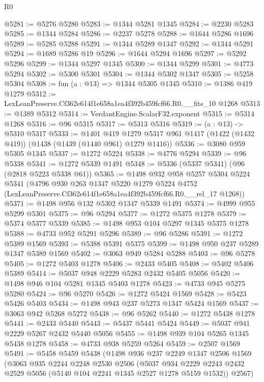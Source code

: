 \begin{lexlean}{R0}
\begin{coremodule}
@5281 := @5276 @5280
@5283 := @1344 @5281 @1345
@5284 := @2230 @5283
@5285 := @1344 @5284
@5286 := @2237 @5278
@5288 := @1644 @5286 @1696
@5289 := @5285 @5288
@5291 := @1344 @5289 @1347
@5292 := @1344 @5291
@5294 := @1689 @5286 @19
@5296 := @1644 @5294 @1696
@5297 := @5292 @5296
@5299 := @1344 @5297 @1345
@5300 := @1344 @5299
@5301 := @4773 @5294
@5302 := @5300 @5301
@5304 := @1344 @5302 @1347
@5305 := @5258 @5304
@5308 := fun (a : @13) => @1344 @5305 @1345
@5310 := @1386 @419 @1279
@5312 := LexLeanPreserve.Cf362e614f1e658a1ea4f392b459fcf66.R0.__fits_10 @1268
@5313 := @1389 @5312
@5314 := VerdantEngine.ScalarF32.exponent
@5315 := @5314 @1268
@5316 := @96 @5315
@5317 := @5313 @5316
@5319 := (a : @13) -> @5310 @5317
@5333 := @1401
    @419
    @1279
    @5317
    @961
    @1417
    (@1422 (@1432 @419))
    (@1438 (@1439 (@1440 @961) @1279 @1416))
@5336 := @3080 @959 @5305 @1345
@5337 := @1272 @5224
@5338 := @4776 @5294
@5339 := @96 @5338
@5341 := @1272 @5339 @1491
@5348 := @5336 (@5337 @5341) (@96 (@2818 @5223 @5338 @61))
@5365 := @1498
    @932
    @958
    @5257
    @5304
    @5224
    @5341
    (@4796
      @930
      @263
      @1347
      @5220
      @1279
      @5224
      @4752
      (LexLeanPreserve.Cf362e614f1e658a1ea4f392b459fcf66.R0.__rel_17 @1268))
@5371 := @1498 @956 @132 @5302 @1347 @5339 @1491
@5374 := @4999 @955 @5299 @5301
@5375 := @96 @5294
@5377 := @1272 @5375 @1278
@5379 := @5374 @5377 @5339
@5385 := @1498 @953 @104 @5297 @1345 @5375 @1278
@5388 := @4733 @952 @5291 @5296
@5389 := @96 @5286
@5391 := @1272 @5389 @1569
@5393 := @5388 @5391 @5375
@5399 := @1498 @950 @237 @5289 @1347 @5389 @1569
@5402 := @3063 @949 @5284 @5288
@5403 := @96 @5278
@5405 := @1272 @5403 @1278
@5406 := @2433 @5405
@5408 := @5402 @5406 @5389
@5414 := @5037 @948 @2229 @5283 @2432 @5405 @5056
@5420 := @1498 @946 @104 @5281 @1345 @5403 @1278
@5423 := @4733 @945 @5275 @5280
@5424 := @96 @5270
@5426 := @1272 @5424 @1569
@5428 := @5423 @5426 @5403
@5434 := @1498 @943 @237 @5273 @1347 @5424 @1569
@5437 := @3063 @942 @5268 @5272
@5438 := @96 @5262
@5440 := @1272 @5438 @1278
@5441 := @2433 @5440
@5443 := @5437 @5441 @5424
@5449 := @5037 @941 @2229 @5267 @2432 @5440 @5056
@5455 := @1498 @939 @104 @5265 @1345 @5438 @1278
@5458 := @4733 @938 @5259 @5264
@5459 := @2507 @1569
@5491 := @5458
    @5459
    @5438
    (@1498
      @936
      @237
      @2249
      @1347
      @2506
      @1569
      (@3063
        @935
        @2244
        @2248
        @2530
        @2506
        (@5037 @934 @2229 @2243 @2432 @2529 @5056 (@5140 @104 @2241 @1345 @2527 @1278 @5159 @1532))
        @2567)

\end{coremodule}
\end{lexlean}
